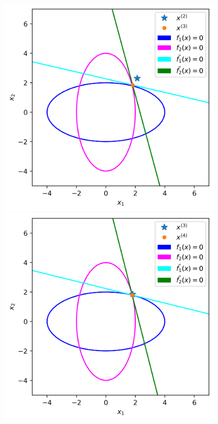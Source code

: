 \documentclass{article}
\begin{document}
\begin{enumerate}
\begin{figure}[!ht]
    \includegraphics[scale=0.5]{fig2.png}
    \includegraphics[scale=0.5]{fig3.png}

\end{figure}
\end{enumerate}
\end{document}
